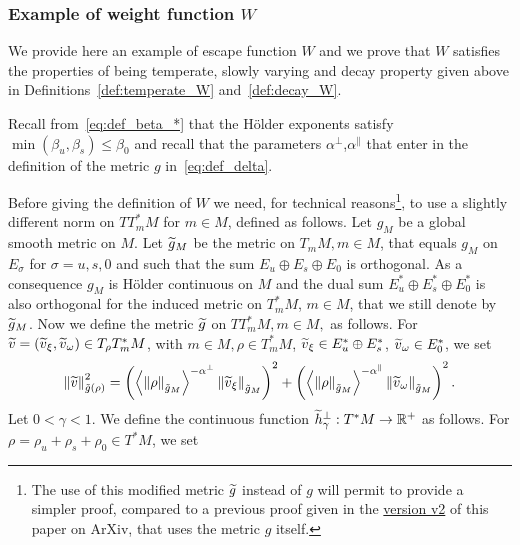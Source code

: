 \documentclass[10pt]{amsart}
\theoremstyle{definition}\newtheorem{defi}[theo]{Definition}\newtheorem{rema}[theo]{Remark}\newtheorem{exam}[theo]{Example}\newtheorem{exem}[theo]{Example}\newtheorem{nota}[theo]{Notation}
\newcommand{\bbR}{\mathbb{R}}
\let\oldtilde\tilde
\renewcommand*{\tilde}[1]{\mathchoice{\widetilde{#1}}{\widetilde{#1}}{\oldtilde{#1}}{\oldtilde{#1}}}
\begin{document}
\subsubsection{Example of weight function \texorpdfstring{$W$}{W}}\label{subsec:Escape-function}

We provide here an example of escape function $W$ and we prove that $W$ satisfies the properties of being temperate, slowly varying and decay property given above in Definitions~\ref{def:temperate_W} and~\ref{def:decay_W}.

Recall from~\eqref{eq:def_beta_*} that the H\"older exponents satisfy $\min(\beta_{u},\beta_{s})\leq\beta_{0}$ and recall that the parameters $\alpha^{\perp}$,$\alpha^{\parallel}$ that enter in the definition of the metric $g$ in~\eqref{eq:def_delta}.

Before giving the definition of $W$ we need, for technical reasons\footnote{The use of this modified metric $\tilde{g}$ instead of $g$ will permit to provide a simpler proof, compared to a previous proof given in the \href{https://arxiv.org/pdf/1706.09307v2.pdf\#page=52}{version v2} of this paper on ArXiv, that uses the metric $g$ itself.}, to use a slightly different norm on $TT_{m}^{*}M$ for $m\in M$, defined as follows. Let $g_{M}$ be a global smooth metric on $M$. Let $\tilde{g}_{M}$ be the metric on $T_{m}M,m\in M$, that equals $g_{M}$ on $E_{\sigma}$ for $\sigma=u,s,0$ and such that the sum $E_{u}\oplus E_{s}\oplus E_{0}$ is orthogonal. As a consequence $g_{M}$ is H\"older continuous on $M$ and the dual sum $E_{u}^{*}\oplus E_{s}^{*}\oplus E_{0}^{*}$ is also orthogonal for the induced metric on $T_{m}^{*}M$, $m\in M$, that we still denote by $\tilde{g}_{M}$. Now we define the metric $\tilde{g}$ on $TT_{m}^{*}M,m\in M,$ as follows. For $\tilde{v}=(\tilde{v}_{\xi},\tilde{v}_{\omega})\in T_{\rho}T_{m}^{*}M$, with $m\in M,\rho\in T_{m}^{*}M$, $\tilde{v}_{\xi}\in E_{u}^{*}\oplus E_{s}^{*}$, $\tilde{v}_{\omega}\in E_{0}^{*}$, we set
\begin{equation}\label{eq:norm_g-1}
\left\Vert \tilde{v}\right\Vert _{\tilde{g}\left(\rho\right)}^{2}=\left(\left\langle \left\Vert \rho\right\Vert _{\tilde{g}_{M}}\right\rangle ^{-\alpha^{\perp}}\left\Vert \tilde{v}_{\xi}\right\Vert _{\tilde{g}_{M}}\right)^{2}+\left(\left\langle \left\Vert \rho\right\Vert _{\tilde{g}_{M}}\right\rangle ^{-\alpha^{\parallel}}\left\Vert \tilde{v}_{\omega}\right\Vert _{\tilde{g}_{M}}\right)^{2}.
\end{equation}
Let $0<\gamma<1$. We define the continuous function $\tilde{h}_{\gamma}^{\perp}:T^{*}M\rightarrow\bbR^{+}$ as follows. For $\rho=\rho_{u}+\rho_{s}+\rho_{0}\in T^{*}M$, we set
\end{document}
